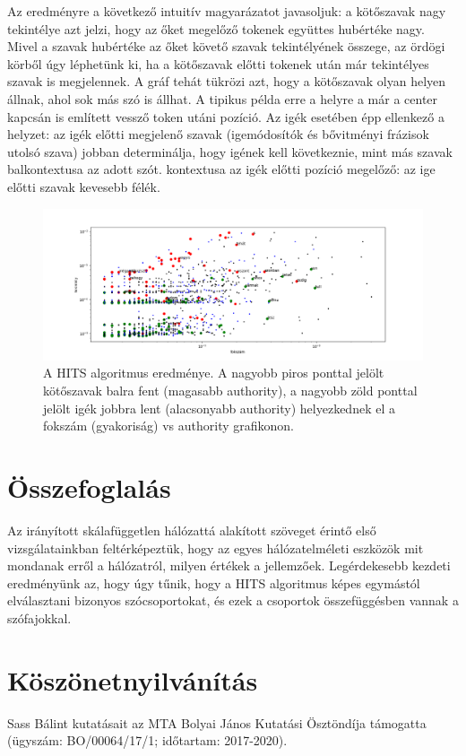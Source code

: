\documentclass{llncs}
\begin{document}
Az eredményre a következő intuitív magyarázatot javasoljuk: a kötőszavak nagy
tekintélye azt jelzi, hogy az őket megelőző tokenek együttes hubértéke nagy.
Mivel a szavak hubértéke az őket követő szavak tekintélyének összege, az ördögi
körből úgy léphetünk ki, ha a kötőszavak előtti tokenek után már tekintélyes
szavak is megjelennek. A gráf tehát tükrözi azt, hogy a kötőszavak olyan helyen
állnak, ahol sok más szó is állhat. A tipikus példa erre a helyre a már a
center kapcsán is említett vessző token utáni pozíció.
Az igék esetében épp ellenkező a helyzet: az igék előtti megjelenő szavak (igemódosítók és
bővitményi frázisok utolsó szava)
jobban determinálja, hogy igének kell következnie, mint más szavak
balkontextusa az adott szót.
kontextusa az igék előtti pozíció megelőző: az ige előtti szavak  kevesebb félék.

\begin{figure}
\begin{center}
\includegraphics[width=25cm]{conv-verb-auth.png}
\caption{A HITS algoritmus eredménye.
A nagyobb piros ponttal jelölt kötőszavak balra fent
(magasabb authority),
a nagyobb zöld ponttal jelölt igék jobbra lent
(alacsonyabb authority)
helyezkednek el
a fokszám (gyakoriság) vs authority grafikonon.}
\end{center}
\label{fig:hits-auth}
\end{figure}


\section{Összefoglalás}

Az irányított skálafüggetlen hálózattá alakított szöveget
érintő első vizsgálatainkban feltérképeztük,
hogy az egyes hálózatelméleti eszközök
mit mondanak erről a hálózatról, milyen értékek a jellemzőek.
%
Legérdekesebb kezdeti eredményünk az,
hogy úgy tűnik, hogy a HITS algoritmus
képes egymástól elválasztani bizonyos szócsoportokat,
és ezek a csoportok összefüggésben vannak a szófajokkal.



\section*{Köszönetnyilvánítás}
\label{Koszonet}

Sass Bálint kutatásait
az MTA Bolyai János Kutatási Ösztöndíja támogatta
(ügyszám: BO/00064/17/1; időtartam: 2017-2020).


%


\end{document}
